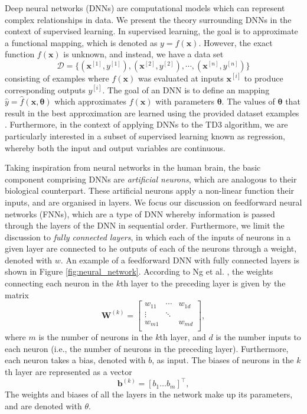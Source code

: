 Deep neural networks (DNNs) are computational models which can represent complex relationships in data.
We present the theory surrounding DNNs in the context of supervised learning.
In supervised learning, the goal is to approximate a functional mapping, which is denoted as $y=f(\bm{x})$.
However, the exact function $f(\bm{x})$ is unknown,  and instead, we have a data set
\begin{equation}\label{eq:supdervised_dataset}
    \mathcal{D} = \{ (\bm{x}^{[1]}, y^{[1]}), (\bm{x}^{[2]}, y^{[2]}), \cdots, (\bm{x}^{[n]}, y^{[n]}) \}
\end{equation}
consisting of examples where $f(\bm{x})$ was evaluated at inputs $\bm{x}^{[i]}$ to produce corresponding outputs $y^{[i]}$.
The goal of an DNN is to define an mapping $\hat{y}=\hat{f}(\bm{x},\bm{\theta})$ which approximates $f(\bm{x})$ with parameters $\bm{\theta}$.
The values of $\bm{\theta}$ that result in the best approximation are learned using the provided dataset examples \cite{Goodfellow2016}.
Furthermore, in the context of applying DNNs to the TD3 algorithm, we are particularly interested in a subset of supervised learning known as regression, whereby both the input and output variables are continuous.


Taking inspiration from neural networks in the human brain, the basic component comprising DNNs are \emph{artificial neurons}, which are analogous to their biological counterpart.
These artificial neurons apply a non-linear function their inputs, and are organised in layers.
We focus our discussion on feedforward neural networks (FNNs), which are a type of DNN whereby information is passed through the layers of the DNN in sequential order.
Furthermore, we limit the discussion to \emph{fully connected layers}, in which each of the inputs of neurons in a given layer are connected to he outputs of each of the neurons through a weight, denoted with $w$.
An example of a feedforward DNN with fully connected layers is shown in Figure \ref{fig:neural_network}.
According to Ng et al. \cite{Ng2019}, the weights connecting each neuron in the $k$th layer to the preceding layer is given by the matrix
\begin{equation}
    \mathbf{W}^{(k)} = 
    \begin{bmatrix}
        w_{11} & \cdots &  w_{1d}   \\
        \vdots & \ddots &           \\
        w_{m1} &        & w_{md}    \\
    \end{bmatrix}, 
\end{equation}
where $m$ is the number of neurons in the $k$th layer, and $d$ is the number inputs to each neuron (i.e., the number of neurons in the preceding layer).
Furthermore, each neuron takes a bias, denoted with $b$, as input. 
The biases of neurons in the $k$th layer are represented as a vector
\begin{equation}
    \mathbf{b}^{(k)} = [ b_1 \ldots b_m ]^\intercal,
\end{equation}
The weights and biases of all the layers in the network make up its parameters, and are denoted with $\theta$.

